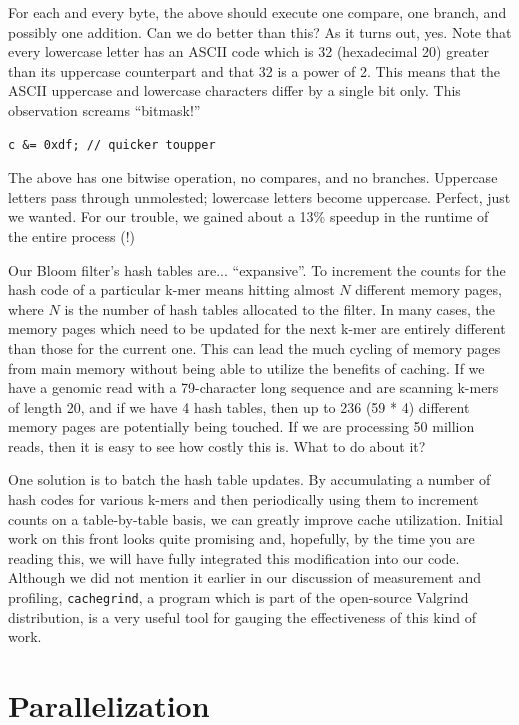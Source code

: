 \documentclass{article}
\begin{document}
For each and every byte, the above should execute one compare, one branch, and
possibly one addition. Can we do better than this? As it turns out, yes. Note
that every lowercase letter has an ASCII code which is 32 (hexadecimal 20)
greater than its uppercase counterpart and that 32 is a power of 2. This means
that the ASCII uppercase and lowercase characters differ by a single bit only.
This observation screams ``bitmask!''

\begin{verbatim}
c &= 0xdf; // quicker toupper
\end{verbatim}

The above has one bitwise operation, no compares, and no branches. Uppercase
letters pass through unmolested; lowercase letters become uppercase. Perfect,
just we wanted. For our trouble, we gained about a 13\% speedup in the
runtime of the entire process (!)

Our Bloom filter's hash tables are... ``expansive''. To increment the counts
for the hash code of a particular k-mer means hitting almost $N$ different
memory pages, where $N$ is the number of hash tables allocated to the filter.
In many cases, the memory pages which need to be updated for the next k-mer are
entirely different than those for the current one. This can lead the much
cycling of memory pages from main memory without being able to utilize the
benefits of caching. If we have a genomic read with a 79-character long
sequence and are scanning k-mers of length 20, and if we have 4 hash tables,
then up to 236 (59 * 4) different memory pages are potentially being touched.
If we are processing 50 million reads, then it is easy to see how costly this
is. What to do about it?

One solution is to batch the hash table updates. By accumulating a number of
hash codes for various k-mers and then periodically using them to increment
counts on a table-by-table basis, we can greatly improve cache utilization.
Initial work on this front looks quite promising and, hopefully, by the time
you are reading this, we will have fully integrated this modification into our
code. Although we did not mention it earlier in our discussion of measurement
and profiling, \texttt{cachegrind}, a program which is part of the open-source
Valgrind \cite{web:Valgrind} distribution, is a very useful tool for gauging
the effectiveness of this kind of work.

\section{Parallelization}
\end{document}
